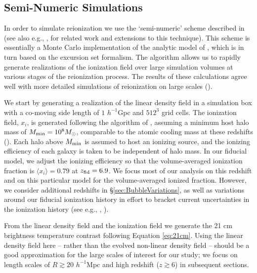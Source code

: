 \subsection{Semi-Numeric Simulations} \label{sec:Bubblesims}

In order to simulate reionization we use the `semi-numeric' scheme described in 
\cite{Zahn:2006sg} (see also e.g., \citealt{Mesinger:2010ne}, for related work and extensions to this technique). This scheme is essentially a Monte Carlo implementation
of the analytic model of \cite{Furlanetto:2004nh}, which is in turn based
on the excursion set formalism. The \cite{Zahn:2006sg} algorithm allows us to rapidly generate
realizations of the ionization field over large simulation volumes at various
stages of the reionization process. The results of these calculations agree well with
more detailed simulations of reionization on large scales (\citealt{Zahn:2006sg,Zahn:2010yw}). 

We start by generating a realization of the linear density field in a simulation
box with a co-moving side length of $1$ $h^{-1}$Gpc and $512^3$ grid cells. The
ionization field, $x_i$, is generated following the algorithm of \cite{Zahn:2006sg},
assuming a minimum host halo mass of $M_{\rm min} = 10^8 M_\odot$, comparable
to the atomic cooling mass at these redshifts (\citealt{Barkana:2000fd}). Each halo above $M_{\rm min}$
is assumed to host an ionizing source, and the ionizing efficiency of each galaxy is taken to be 
independent of halo mass. In our fiducial model, we adjust the ionizing efficiency
so that the volume-averaged ionization fraction is $\langle x_i \rangle = 0.79$ at
$z_{\rm fid} = 6.9$. We focus most of our analysis on this redshift and on this
particular model for the volume-averaged ionized fraction. However, we consider additional 
redshifts in \S\ref{sec:BubbleVariations}, as well as variations around our fiducial
ionization history in effort to bracket current uncertainties in the ionization history (see 
e.g., \citealt{Kuhlen:2012vy}, \citealt{Zahn:2011vp}).

From the linear density field
and the ionization field we generate the 21 cm brightness temperature
contrast following Equation \ref{eq:21cm}.  Using the linear density field here -- rather
than the evolved non-linear density field -- should be a good approximation for the large
scales of interest for our study; we focus on length scales of $R \gtrsim 20$ $h^{-1}$Mpc and high redshift ($z \gtrsim 6$) 
in subsequent sections. 

